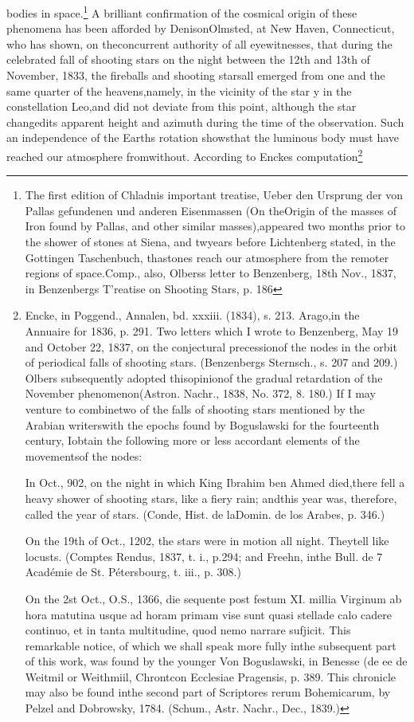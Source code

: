 bodies in space.\footnote{The first edition of Chladnis important treatise, Ueber den Ursprung der von Pallas gefundenen und anderen Eisenmassen (On theOrigin of the masses of Iron found by Pallas, and other similar masses),appeared two months prior to the shower of stones at Siena, and twyears before Lichtenberg stated, in the Gottingen Taschenbuch, thastones reach our atmosphere from the remoter regions of space.Comp., also, Olberss letter to Benzenberg, 18th Nov., 1837, in Benzenbergs T'reatise on Shooting Stars, p. 186} A brilliant confirmation of the cosmical origin of these phenomena has been afforded by DenisonOlmsted, at New Haven, Connecticut, who has shown, on theconcurrent authority of all eyewitnesses, that during the celebrated fall of shooting stars on the night between the 12th and 13th of November, 1833, the fireballs and shooting starsall emerged from one and the same quarter of the heavens,namely, in the vicinity of the star y in the constellation Leo,and did not deviate from this point, although the star changedits apparent height and azimuth during the time of the observation. Such an independence of the Earths rotation showsthat the luminous body must have reached our atmosphere fromwithout. According to Enckes computation\footnote{Encke, in Poggend., Annalen, bd. xxxiii. (1834), s. 213. Arago,in the Annuaire for 1836, p. 291. Two letters which I wrote to Benzenberg, May 19 and October 22, 1837, on the conjectural precessionof the nodes in the orbit of periodical falls of shooting stars. (Benzenbergs Sternsch., s. 207 and 209.) Olbers subsequently adopted thisopinionof the gradual retardation of the November phenomenon(Astron. Nachr., 1838, No. 372, 8. 180.) If I may venture to combinetwo of the falls of shooting stars mentioned by the Arabian writerswith the epochs found by Boguslawski for the fourteenth century, Iobtain the following more or less accordant elements of the movementsof the nodes: 
 
 In Oct., 902, on the night in which King Ibrahim ben Ahmed died,there fell a heavy shower of shooting stars, like a fiery rain; andthis year was, therefore, called the year of stars. (Conde, Hist. de laDomin. de los Arabes, p. 346.)
 
 On the 19th of Oct., 1202, the stars were in motion all night.  Theytell like locusts. (Comptes Rendus, 1837, t. i., p.294; and Freehn, inthe Bull. de 7 Acad\'{e}mie de St. P\'{e}tersbourg, t. iii., p. 308.)
 
 On the 2st Oct., O.S., 1366,  die sequente post festum XI. millia Virginum ab hora matutina usque ad horam primam vise sunt quasi stellade calo cadere continuo, et in tanta multitudine, quod nemo narrare sufjicit. This remarkable notice, of which we shall speak more fully inthe subsequent part of this work, was found by the younger Von Boguslawski, in Benesse (de ee de Weitmil or Weithmiil, Chrontcon Ecclesiae Pragensis, p. 389. This chronicle may also be found inthe second part of Scriptores rerum Bohemicarum, by Pelzel and Dobrowsky, 1784. (Schum., Astr. Nachr., Dec., 1839.)
 
}
